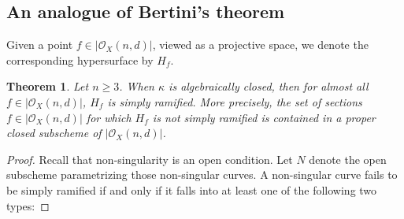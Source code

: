 \documentclass[12pt]{article}
\theoremstyle{plain}
\newtheorem{theorem}[equation]{Theorem}
\theoremstyle{definition}
\newcommand{\sO}{\mathcal{O}}
\newcommand{\<}{\langle}
\renewcommand{\>}{\rangle}
\begin{document}
\subsection{An analogue of Bertini's theorem} 
Given a point $f \in |\sO_X(n,d)|$, viewed as a projective space, we denote the corresponding hypersurface by $H_f$. 
\begin{theorem}
Let $n \ge 3$. When $\kappa$ is algebraically closed, then for almost all $f \in |\sO_X(n,d)|$, $H_f$ is simply ramified. More precisely, the set of sections $f \in |\sO_X(n, d)|$ for which $H_f$ is not simply ramified is contained in a proper closed subscheme of $|\sO_X(n, d)|$. 
\end{theorem} 
\begin{proof}
Recall that non-singularity is an open condition. Let $N$ denote the open subscheme parametrizing those non-singular curves. A non-singular curve fails to be simply ramified if and only if it falls into at least one of the following two types: 


\end{proof}
\end{document}

